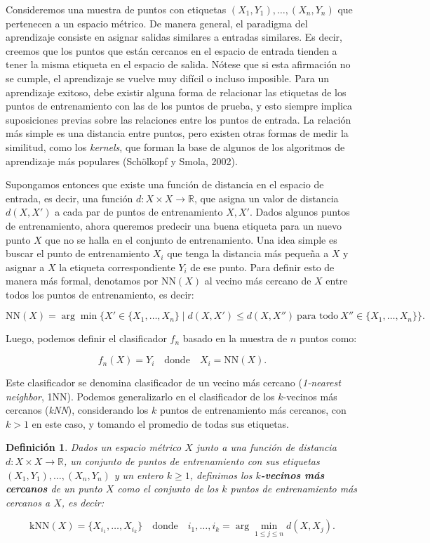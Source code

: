 \documentclass{article}
\newtheorem{dfn}{Definición}[subsection]
\begin{document}
Consideremos una muestra de puntos con etiquetas \((X_1, Y_1), \dots, (X_n, Y_n)\) que 
pertenecen a un espacio métrico. De manera general, el paradigma del aprendizaje consiste en asignar salidas 
similares a entradas similares. Es decir, creemos que los puntos que están cercanos en el espacio 
de entrada tienden a tener la misma etiqueta en el espacio de salida. Nótese que si esta afirmación 
no se cumple, el aprendizaje se vuelve muy difícil o incluso imposible. Para un aprendizaje exitoso, 
debe existir alguna forma de relacionar las etiquetas de los puntos de entrenamiento con las de los 
puntos de prueba, y esto siempre implica suposiciones previas sobre las relaciones entre los puntos 
de entrada. La relación más simple es una distancia entre puntos, pero existen otras formas de medir 
la similitud, como los \textit{kernels}, que forman la base de algunos de los algoritmos 
de aprendizaje más populares (Schölkopf y Smola, 2002).

Supongamos entonces que existe una función de distancia en el espacio de entrada, es decir, una función 
\(d : X \times X \to \mathbb{R}\), que asigna un valor de distancia \(d(X, X')\) a cada par de puntos 
de entrenamiento \(X, X'\). Dados algunos puntos de entrenamiento, ahora queremos predecir una buena 
etiqueta para un nuevo punto \(X\) que no se halla en el conjunto de entrenamiento.
 Una idea simple es buscar el punto de entrenamiento \(X_i\) 
que tenga la distancia más pequeña a \(X\) y asignar a \(X\) la etiqueta correspondiente \(Y_i\) de 
ese punto. Para definir esto de manera más formal, denotamos por \(\text{NN}(X)\) al vecino más cercano 
de \(X\) entre todos los puntos de entrenamiento, es decir:

\[
\text{NN}(X) = \arg\min \{X' \in \{X_1, \dots, X_n\} \mid d(X, X') \leq d(X, X'') \ \text{para todo} \ X'' \in \{X_1, \dots, X_n\}\}.
\]

Luego, podemos definir el clasificador \(f_n\) basado en la muestra de \(n\) puntos como:

\[
f_n(X) = Y_i \quad \text{donde} \quad X_i = \text{NN}(X).
\]

Este clasificador se denomina clasificador de un vecino más cercano (\textit{1-nearest neighbor}, 1NN). 
Podemos generalizarlo en el clasificador de los \(k\)-vecinos más cercanos (\textit{kNN}), considerando los \(k\) puntos de 
entrenamiento más cercanos, con $k>1$ en este caso, y tomando el promedio de todas sus etiquetas. 


\begin{dfn}
    Dados un espacio métrico \(X\) junto a una función de distancia \(d : X \times X \to \mathbb{R}\), 
    un conjunto de puntos de entrenamiento con sus etiquetas \((X_1, Y_1), \dots, (X_n, Y_n)\) y un entero \(k \geq 1\), 
    definimos los \textbf{\(k\)-vecinos más cercanos} de un punto \(X\) como el conjunto de los \(k\) puntos 
    de entrenamiento más cercanos a \(X\), es decir:

    \[
    \text{kNN}(X) = \{X_{i_1}, \dots, X_{i_k}\} \quad \text{donde} \quad i_1, \dots, i_k = \arg\min_{1 \leq j \leq n} d(X, X_j).
    \]
\end{dfn}
\end{document}
